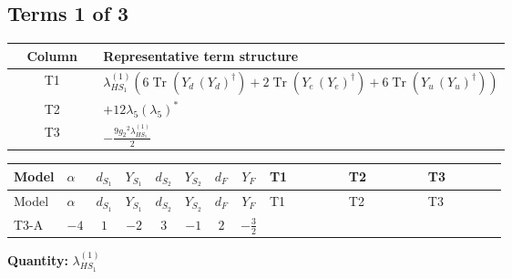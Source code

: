 \documentclass[8pt]{article}
\begin{document}
\begin{landscape}
\subsection*{Terms 1 of 3}
\begin{center}
\begin{tabular}{@{}c >{\raggedright\arraybackslash}p{0.82\linewidth}@{}}
\toprule
Column & Representative term structure \\
\midrule
T1 & \(\displaystyle {\lambda_{HS_1}^{(1)}} (6 \operatorname{Tr}\!\left({Y_d}\,\left({Y_d}\right)^{\dagger}\right)+2 \operatorname{Tr}\!\left({Y_e}\,\left({Y_e}\right)^{\dagger}\right)+6 \operatorname{Tr}\!\left({Y_u}\,\left({Y_u}\right)^{\dagger}\right))\) \\
\midrule
T2 & \(\displaystyle +12 {\lambda_5} \left({\lambda_5}\right)^{*}\) \\
\midrule
T3 & \(\displaystyle -\frac{9 {g_2}^2 {\lambda_{HS_1}^{(1)}}}{2}\) \\
\midrule
\bottomrule
\end{tabular}
\end{center}
\smallskip
\tiny
\begin{longtable}{@{}llcccccc >{\raggedright\arraybackslash}p{0.21\linewidth} >{\raggedright\arraybackslash}p{0.21\linewidth} >{\raggedright\arraybackslash}p{0.21\linewidth}@{}}
\toprule
Model & $\alpha$ & $d_{S_1}$ & $Y_{S_1}$ & $d_{S_2}$ & $Y_{S_2}$ & $d_F$ & $Y_F$ & T1 & T2 & T3 \\
\midrule
\endfirsthead
\toprule
Model & $\alpha$ & $d_{S_1}$ & $Y_{S_1}$ & $d_{S_2}$ & $Y_{S_2}$ & $d_F$ & $Y_F$ & T1 & T2 & T3 \\
\midrule
\endhead
T3-A & $-4$ & $1$ & $-2$ & $3$ & $-1$ & $2$ & $-\frac{3}{2}$ & \scriptsize\adjustbox{max width=\linewidth}{$\begin{gathered} {\lambda_{HS_1}^{(1)}} (6 \operatorname{Tr}\!\left({Y_d}\,\left({Y_d}\right)^{\dagger}\right)+2 \operatorname{Tr}\!\left({Y_e}\,\left({Y_e}\right)^{\dagger}\right)+6 \operatorname{Tr}\!\left({Y_u}\,\left({Y_u}\right)^{\dagger}\right))\end{gathered}$} & \scriptsize\adjustbox{max width=\linewidth}{$\begin{gathered} +12 {\lambda_5} \left({\lambda_5}\right)^{*}\end{gathered}$} & \scriptsize\adjustbox{max width=\linewidth}{$\begin{gathered} -\frac{9 {g_2}^2 {\lambda_{HS_1}^{(1)}}}{2}\end{gathered}$} \\
\midrule
\bottomrule
\end{longtable}
\clearpage
\noindent\textbf{Quantity: }$\lambda_{HS_1}^{(1)}$\par\smallskip

\end{landscape}
\end{document}
